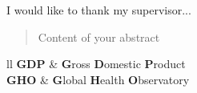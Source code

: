 \documentclass[
11pt, %
oneside, %
english, %
singlespacing, %
liststotoc, %
]{MastersDoctoralThesis} %
\begin{document}


\begin{acknowledgements}
	I would like to thank my supervisor...
	
\end{acknowledgements}



\begin{abstract}
\addchaptertocentry{\abstractname} %

Content of your abstract

\vfill
\keywordnames
\end{abstract}

\tableofcontents %
\listoffigures %
\listoftables %


\begin{abbreviations}{ll} %
\textbf{GDP} & \textbf{G}ross \textbf{D}omestic \textbf{P}roduct \\
\textbf{GHO} & \textbf{G}lobal \textbf{H}ealth \textbf{O}bservatory \\

\end{abbreviations}

\end{document}

